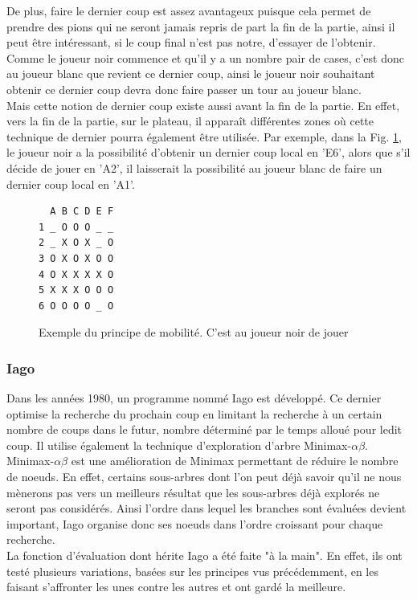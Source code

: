 \documentclass[10pt,a4paper]{article}
\begin{document}
\begin{itemize}
De plus, faire le dernier coup est assez avantageux puisque cela permet de prendre des pions qui ne seront jamais repris de part la fin de la partie, ainsi il peut être intéressant, si le coup final n'est pas notre, d'essayer de l'obtenir. Comme le joueur noir commence et qu'il y a un nombre pair de cases, c'est donc au joueur blanc que revient ce dernier coup, ainsi le joueur noir souhaitant obtenir ce dernier coup devra donc faire passer un tour au joueur blanc.\\

Mais cette notion de dernier coup existe aussi avant la fin de la partie. En effet, vers la fin de la partie, sur le plateau, il apparaît différentes zones où cette technique de dernier pourra également être utilisée. Par exemple, dans la Fig. \ref{fig:mobilité}, le joueur noir a la possibilité d'obtenir un dernier coup local en 'E6', alors que s'il décide de jouer en 'A2', il laisserait la possibilité au joueur blanc de faire un dernier coup local en 'A1'.
\begin{figure}[H]    
\centering
\begin{BVerbatim}
  A B C D E F
1 _ O O O _ _
2 _ X O X _ O
3 O X O X O O
4 O X X X X O
5 X X X O O O
6 O O O O _ O
\end{BVerbatim}
\caption {Exemple du principe de mobilité. C'est au joueur noir de jouer\label{fig:mobilité}}
\end{figure}
\end{itemize}

\subsubsection {Iago}

Dans les années 1980, un programme nommé Iago\cite{Ros81} est développé. Ce dernier optimise la recherche du prochain coup en limitant la recherche à un certain nombre de coups dans le futur, nombre déterminé par le temps alloué pour ledit coup. Il utilise également la technique d'exploration d'arbre Minimax-$\alpha\beta$. Minimax-$\alpha\beta$ est une amélioration de Minimax permettant de réduire le nombre de noeuds. En effet, certains sous-arbres dont l'on peut déjà savoir qu'il ne nous mènerons pas vers un meilleurs résultat que les sous-arbres déjà explorés ne seront pas considérés. Ainsi l'ordre dans lequel les branches sont évaluées devient important, Iago organise donc ses noeuds dans l'ordre croissant pour chaque recherche.\\

La fonction d'évaluation dont hérite Iago a été faite "à la main". En effet, ils ont testé plusieurs variations, basées sur les principes vus précédemment, en les faisant s'affronter les unes contre les autres et ont gardé la meilleure.
\end{document}
